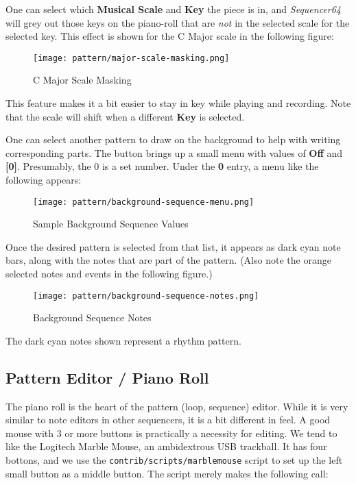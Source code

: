    One can select which \textbf{Musical Scale} and
   \textbf{Key} the piece is in,
   and \textsl{Sequencer64} will grey out those keys on the piano-roll that
   are \textsl{not} in the selected scale for the selected key.
   This effect is shown for the C Major scale in the following figure:

\begin{figure}[H]
   \centering 
   \texttt{[image: pattern/major-scale-masking.png]}
   \caption{C Major Scale Masking}
   \label{fig:pattern_editor_major_scale_masking}
\end{figure}

   This feature makes it a bit easier to stay in key while playing and
   recording.  Note that the scale will shift when a different
   \textbf{Key} is selected.

   One can select another pattern to draw on the background to help with
   writing corresponding parts.
   The button brings up a small menu with values of \textbf{Off} and
   \textbf{[0]}.  Presumably, the 0 is a set number.  Under the \textbf{0}
   entry, a menu like the following appears:

\begin{figure}[H]
   \centering 
   \texttt{[image: pattern/background-sequence-menu.png]}
   \caption{Sample Background Sequence Values}
   \label{fig:pattern_editor_background_sequence_menu}
\end{figure}

   Once the desired pattern is selected from that list, it appears as
   dark cyan note bars, along with the notes that are part of the pattern.
   (Also note the orange selected notes and events in the following figure.)

\begin{figure}[H]
   \centering 
   \texttt{[image: pattern/background-sequence-notes.png]}
   \caption{Background Sequence Notes}
   \label{fig:pattern_editor_background_sequence_notes}
\end{figure}

   The dark cyan notes shown represent a rhythm pattern.

\subsection{Pattern Editor / Piano Roll}
\label{subsec:seq64_pattern_editor_piano_roll}

   The piano roll is the heart of the pattern (loop, sequence) editor.
   While it is very similar to note editors in other sequencers, it is a bit
   different in feel.  A good mouse with 3 or more buttons is practically a
   necessity for editing.  We tend to like the Logitech Marble Mouse, an
   ambidextrous USB trackball.  It has four bottons, and we use the
   \texttt{contrib/scripts/marblemouse} script to set up the left small
   button as a middle button.  The script merely makes the following call:

